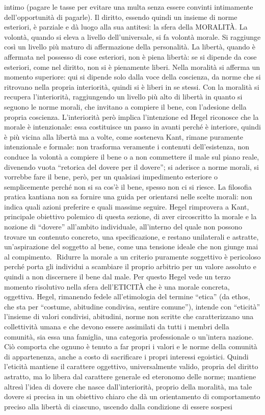 \documentclass[a4paper,12pt,oneside,openany]{book}%
\begin{document}
intimo (pagare le tasse per evitare una multa senza essere convinti intimamente dell’opportunità di pagarle). Il diritto, essendo quindi un insieme di norme esteriori, è parziale e dà luogo alla sua antitesi: la sfera della MORALITÀ. La volontà, quando si eleva a livello dell’universale, si fa volontà morale. Si raggiunge così un livello più maturo di affermazione della personalità. La libertà, quando è affermata nel possesso di cose esteriori, non è piena libertà: se si dipende da cose esteriori, come nel diritto, non si è pienamente liberi. Nella moralità si afferma un momento superiore: qui si dipende solo dalla voce della coscienza, da norme che si ritrovano nella propria interiorità, quindi si è liberi in se stessi. Con la moralità si recupera l’interiorità, raggiungendo un livello più alto di libertà in quanto si seguono le norme morali, che invitano a compiere il bene, con l’adesione della propria coscienza. L’interiorità però implica l’intenzione ed Hegel riconosce che la morale è intenzionale: essa costituisce un passo in avanti perché è interiore, quindi è più vicina alla libertà ma a volte, come sosteneva Kant, rimane puramente intenzionale e formale: non trasforma veramente i contenuti dell’esistenza, non conduce la volontà a compiere il bene o a non commettere il male sul piano reale, divenendo vuota “retorica del dovere per il dovere”; si aderisce a norme morali, si vorrebbe fare il bene, però, per un qualsiasi impedimento esteriore o semplicemente perché non si sa cos’è il bene, spesso non ci si riesce. La filosofia pratica kantiana non sa fornire una guida per orientarsi nelle scelte morali: non indica quali azioni preferire e quali massime seguire. Hegel rimprovera a Kant, principale obiettivo polemico di questa sezione, di aver circoscritto la morale e la nozione di “dovere” all’ambito individuale, all’interno del quale non possono trovare un contenuto concreto, una specificazione, e restano unilaterali e astratte, un’aspirazione del soggetto al bene, come una tensione ideale che non giunge mai al compimento.  Ridurre la morale a un criterio puramente soggettivo è pericoloso perché porta gli individui a scambiare il proprio arbitrio per un valore assoluto e quindi a non discernere il bene dal male. Per questo Hegel vede un terzo momento risolutivo nella sfera dell’ETICITÀ che è una morale concreta, oggettiva. Hegel, rimanendo fedele all’etimologia del termine “etica” (da ethos, che sta per “costume, abitudine condivisa, sentire comune”), intende con “eticità” l’insieme di valori condivisi, abitudini, norme non scritte che caratterizzano una collettività umana e che devono essere assimilati da tutti i membri della comunità, sia essa una famiglia, una categoria professionale o un’intera nazione. Ciò comporta che ognuno è tenuto a far propri i valori e le norme della comunità di appartenenza, anche a costo di sacrificare i propri interessi egoistici. Quindi l’eticità mantiene il carattere oggettivo, universalmente valido, propria del diritto astratto, ma lo libera dal carattere generale ed eteronomo delle norme; mantiene altresì l’idea di dovere che nasce dall’interiorità, proprio della moralità, ma tale dovere si precisa in un obiettivo chiaro che dà un orientamento di comportamento preciso alla libertà di ciascuno, uscendo dalla condizione di essere sospesi 
\end{document}
